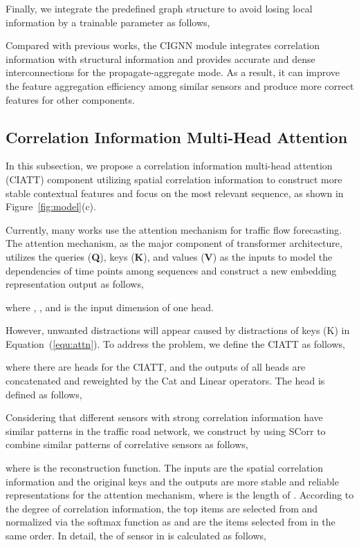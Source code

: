 \documentclass[sn-mathphys,iicol]{sn-jnl}
\newcommand\figref[1]{Figure~\ref{#1}}
\newcommand\equref[1]{Equation~(\ref{#1})}
\theoremstyle{thmstyleone}\newtheorem{theorem}{Theorem}\newtheorem{proposition}[theorem]{Proposition}
\theoremstyle{thmstyletwo}\newtheorem{example}{Example}\newtheorem{remark}{Remark}
\theoremstyle{thmstylethree}\newtheorem{definition}{Definition}
\begin{document}
Finally, we integrate the predefined graph structure to avoid losing local information by a trainable parameter  as follows,


Compared with previous works, the CIGNN module integrates correlation information with structural information and provides accurate and dense interconnections for the propagate-aggregate mode. As a result, it can improve the feature aggregation efficiency among similar sensors and produce more correct features for other components.

\subsection{Correlation Information Multi-Head Attention}
In this subsection, we propose a correlation information multi-head attention (CIATT) component utilizing spatial correlation information to construct more stable contextual features and focus on the most relevant sequence, as shown in \figref{fig:model}(c).

Currently, many works use the attention mechanism for traffic flow forecasting. The attention mechanism, as the major component of transformer architecture, utilizes the queries (\textbf{Q}), keys (\textbf{K}), and values (\textbf{V}) as the inputs to model the dependencies of time points among sequences and construct a new embedding representation output as follows,

where , ,  and  is the input dimension of one head. 



However, unwanted distractions will appear caused by distractions of keys (K) in \equref{equ:attn}. To address the problem, we define the CIATT as follows,

where there are  heads for the CIATT, and the outputs of all heads are concatenated and reweighted by the Cat and Linear operators. The  head is defined as follows,


Considering that different sensors with strong correlation information have similar patterns in the traffic road network, we construct  by using SCorr to combine similar patterns of correlative sensors as follows,

where  is the reconstruction function. The inputs are the spatial correlation information and the original keys  and the outputs  are more stable and reliable representations for the attention mechanism, where  is the length of . According to the degree of correlation information, the top  items are selected from  and normalized via the softmax function as  and  are the items selected from  in the same order.
In detail, the  of sensor  in  is calculated as follows, 
 
\end{document}
